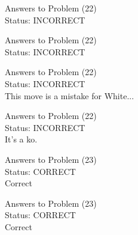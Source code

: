 \documentclass[11pt]{article}
\begin{document}
\begin{minipage}[t]{0.5\textwidth}
  {\centering
  
  Answers to Problem (22)\\
  Status: INCORRECT\\
  
  }
\end{minipage}
\begin{minipage}[t]{0.5\textwidth}
  {\centering
  
  Answers to Problem (22)\\
  Status: INCORRECT\\
  
  }
\end{minipage}
\begin{minipage}[t]{0.5\textwidth}
  {\centering
  
  Answers to Problem (22)\\
  Status: INCORRECT\\
  This move is a mistake for White...\\
  }
\end{minipage}
\begin{minipage}[t]{0.5\textwidth}
  {\centering
  
  Answers to Problem (22)\\
  Status: INCORRECT\\
  It's a ko.\\
  }
\end{minipage}
\begin{minipage}[t]{0.5\textwidth}
  {\centering
  
  Answers to Problem (23)\\
  Status: CORRECT\\
  Correct\\
  }
\end{minipage}
\begin{minipage}[t]{0.5\textwidth}
  {\centering
  
  Answers to Problem (23)\\
  Status: CORRECT\\
  Correct\\
  }
\end{minipage}
\end{document}
